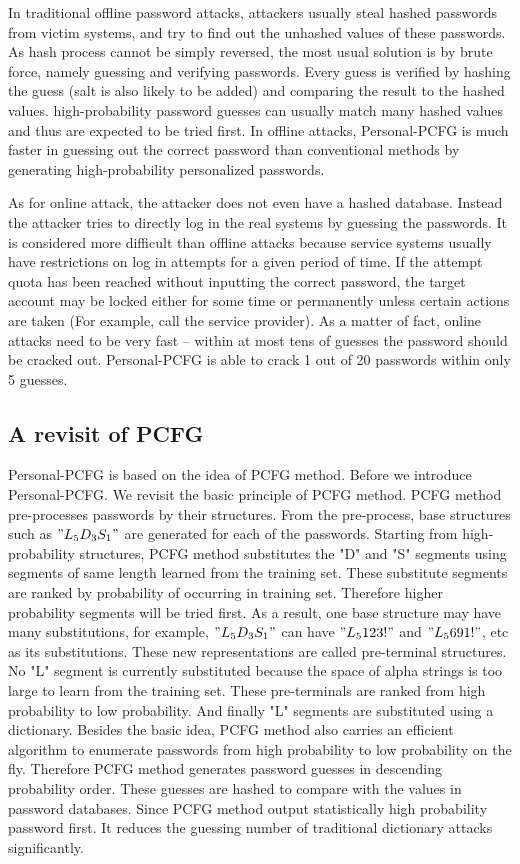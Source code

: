 In traditional offline password attacks, attackers usually steal hashed passwords from victim systems, and try to find out the unhashed values of these passwords. As hash process cannot be simply reversed, the most usual solution is by brute force, namely guessing and verifying passwords. Every guess is verified by hashing the guess (salt is also likely to be added) and comparing the result to the hashed values. high-probability password guesses can usually match many hashed values and thus are expected to be tried first. In offline attacks, Personal-PCFG is much faster in guessing out the correct password than conventional methods by generating high-probability personalized passwords.

As for online attack, the attacker does not even have a hashed database. Instead the attacker tries to directly log in the real systems by guessing the passwords. It is considered more difficult than offline attacks because service systems usually have restrictions on log in attempts for a given period of time. If the attempt quota has been reached without inputting the correct password, the target account may be locked either for some time or permanently unless certain actions are taken (For example, call the service provider). As a matter of fact, online attacks need to be very fast -- within at most tens of guesses the password should be cracked out. Personal-PCFG is able to crack 1 out of 20 passwords within only 5 guesses. 

\subsection{A revisit of PCFG}
Personal-PCFG is based on the idea of PCFG method. Before we introduce Personal-PCFG. We revisit the basic principle of PCFG method. PCFG method pre-processes passwords by their structures. From the pre-process, base structures such as $"L_5D_3S_1"$ are generated for each of the passwords. Starting from high-probability structures, PCFG method substitutes the "D" and "S" segments using segments of same length learned from the training set. These substitute segments are ranked by probability of occurring in training set. Therefore higher probability segments will be tried first. As a result, one base structure may have many substitutions, for example, $"L_5D_3S_1"$ can have $"L_5123!"$ and $"L_5691!"$, etc as its substitutions. These new representations are called pre-terminal structures. No "L" segment is currently substituted because the space of alpha strings is too large to learn from the training set. These pre-terminals are ranked from high probability to low probability. And finally "L" segments are substituted using a dictionary. Besides the basic idea, PCFG method also carries an efficient algorithm to enumerate passwords from high probability to low probability on the fly. Therefore PCFG method generates password guesses in descending probability order. These guesses are hashed to compare with the values in password databases. Since PCFG method output statistically high probability password first. It reduces the guessing number of traditional dictionary attacks significantly. 


